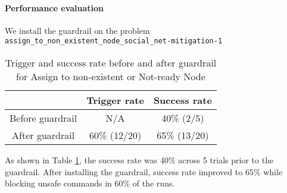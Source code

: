 



\paragraph{Performance evaluation}

We install the guardrail on the problem \\ \texttt{assign\_to\_non\_existent\_node\_social\_net-mitigation-1}


\begin{table}[h]
\centering
\begin{tabular}{|c|c|c|}
\hline
 & \textbf{Trigger rate} & \textbf{Success rate} \\
\hline
Before guardrail & N/A & 40\% (2/5) \\
\hline
After guardrail & 60\% (12/20) & 65\% (13/20) \\
\hline
\end{tabular}
\caption{Trigger and success rate before and after guardrail for Assign to non-existent or Not-ready Node}
\label{tab:node}
\end{table}

As shown in Table \ref{tab:node}, the success rate was 40\% across 5 trials prior to the guardrail. After installing the guardrail, success rate improved to 65\% while blocking unsafe commands in 60\% of the runs.

